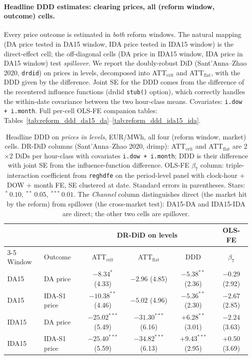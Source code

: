 \documentclass[11pt,a4paper]{article}
\newcommand{\code}[1]{\nolinkurl{#1}}
\begin{document}
\paragraph{Headline DDD estimates: clearing prices, all (reform window, outcome) cells.}
Every price outcome is estimated in \emph{both} reform windows. The natural mapping (DA price tested in DA15 window, IDA price tested in IDA15 window) is the direct-effect cell; the off-diagonal cells (DA price in IDA15 window, IDA price in DA15 window) test \emph{spillover}. We report the doubly-robust DiD (Sant'Anna--Zhao 2020, \code{drdid}) on prices in levels, decomposed into ATT$_{\text{crit}}$ and ATT$_{\text{flat}}$, with the DDD given by the difference. Joint SE for the DDD comes from the difference of the recentered influence functions (drdid \code{stub()} option), which correctly handles the within-date covariance between the two hour-class means. Covariates: \code{i.dow + i.month}. Full per-cell OLS-FE companion tables: Tables~\ref{tab:reform_ddd_da15_da}--\ref{tab:reform_ddd_ida15_ida}.

\begin{table}[H]
\centering\footnotesize
\setlength{\tabcolsep}{4pt}
\caption{Headline DDD on \emph{prices in levels}, EUR/MWh, all four (reform window, market) cells. DR-DiD columns (Sant'Anna--Zhao 2020, drimp): ATT$_{\text{crit}}$ and ATT$_{\text{flat}}$ are 2$\times$2 DiDs per hour-class with covariates \code{i.dow + i.month}; DDD is their difference with joint SE from the influence-function difference. OLS-FE $\beta_7$ column: triple-interaction coefficient from \code{reghdfe} on the period-level panel with clock-hour + DOW + month FE, SE clustered at date. Standard errors in parentheses. Stars: $^{*}~0.10,~^{**}~0.05,~^{***}~0.01$. The \emph{Channel} column distinguishes direct (the market hit by the reform) from spillover (the cross-market test): DA15-DA and IDA15-IDA are direct; the other two cells are spillover.}
\label{tab:reform_ddd_summary}
\begin{tabular}{llcccc}
\toprule
& & \multicolumn{3}{c}{DR-DiD on levels} & OLS-FE \\
\cmidrule(lr){3-5}
Window & Outcome & ATT$_{\text{crit}}$ & ATT$_{\text{flat}}$ & DDD & $\beta_7$ \\
\midrule
DA15  & DA price        & $-8.34^{*}$ \scriptsize{(4.33)}    & $-2.96$ \scriptsize{(4.85)}     & $-5.38^{**}$ \scriptsize{(2.36)}  & $-0.29$ \scriptsize{(2.92)} \\
DA15  & IDA-S1 price    & $-10.38^{**}$ \scriptsize{(4.46)}  & $-5.02$ \scriptsize{(4.96)}     & $-5.36^{**}$ \scriptsize{(2.30)}  & $-2.67$ \scriptsize{(2.85)} \\
IDA15 & DA price        & $-25.02^{***}$ \scriptsize{(5.49)} & $-31.30^{***}$ \scriptsize{(6.16)} & $+6.28^{**}$ \scriptsize{(3.01)}  & $-2.24$ \scriptsize{(3.63)} \\
IDA15 & IDA-S1 price    & $-25.40^{***}$ \scriptsize{(5.59)} & $-34.82^{***}$ \scriptsize{(6.13)} & $+9.43^{***}$ \scriptsize{(2.95)} & $+0.50$ \scriptsize{(3.69)} \\
\bottomrule
\end{tabular}
\end{table}
\end{document}
